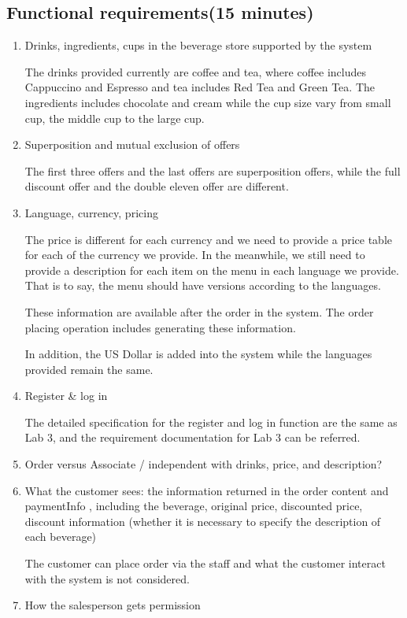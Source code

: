 \documentclass[a4paper]{report}
\begin{document}
\subsection{Functional requirements(15 minutes)}
\begin{enumerate}
\item Drinks, ingredients, cups in the beverage store supported by the system 
\par
The drinks provided currently are coffee and tea, where coffee includes Cappuccino and Espresso and tea includes Red Tea and Green Tea. The ingredients includes chocolate and cream while the cup size vary from small cup, the middle cup to the large cup.
\item Superposition and mutual exclusion of offers 
\par
The first three offers and the last offers are superposition offers, while the full discount offer and the double eleven offer are different.
\item Language, currency, pricing 
\par
The price is different for each currency and we need to provide a price table for each of the currency we provide. In the meanwhile, we still need to provide a description for each item on the menu in each language we provide. That is to say, the menu should have versions according to the languages.
\par
These information are available after the order in the system. The order placing operation includes generating these information.
\par
In addition, the US Dollar is added into the system while the languages provided remain the same.
\item Register \& log in 
\par
The detailed specification for the register and log in function are the same as Lab 3, and the requirement documentation for Lab 3 can be referred.
\item Order versus Associate / independent with drinks, price, and description?
\item What the customer sees: the information returned in the order content and paymentInfo , including the beverage, original price, discounted price, discount information (whether it is necessary to specify the description of each beverage) 
\par
The customer can place order via the staff and what the customer interact with the system is not considered.
\item How the salesperson gets permission 

\end{enumerate}
\end{document}
